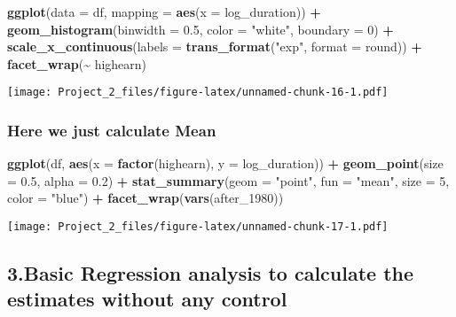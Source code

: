 \documentclass[
]{article}
\newenvironment{Shaded}{\begin{snugshade}}{\end{snugshade}}
\newcommand{\AttributeTok}[1]{\textcolor[rgb]{0.13,0.29,0.53}{#1}}
\newcommand{\DecValTok}[1]{\textcolor[rgb]{0.00,0.00,0.81}{#1}}
\newcommand{\FloatTok}[1]{\textcolor[rgb]{0.00,0.00,0.81}{#1}}
\newcommand{\FunctionTok}[1]{\textcolor[rgb]{0.13,0.29,0.53}{\textbf{#1}}}
\newcommand{\NormalTok}[1]{#1}
\newcommand{\SpecialCharTok}[1]{\textcolor[rgb]{0.81,0.36,0.00}{\textbf{#1}}}
\newcommand{\StringTok}[1]{\textcolor[rgb]{0.31,0.60,0.02}{#1}}
\begin{document}
\begin{Shaded}
\begin{Highlighting}[]
\FunctionTok{ggplot}\NormalTok{(}\AttributeTok{data =}\NormalTok{ df, }\AttributeTok{mapping =} \FunctionTok{aes}\NormalTok{(}\AttributeTok{x =}\NormalTok{ log\_duration)) }\SpecialCharTok{+}
  \FunctionTok{geom\_histogram}\NormalTok{(}\AttributeTok{binwidth =} \FloatTok{0.5}\NormalTok{, }\AttributeTok{color =} \StringTok{"white"}\NormalTok{, }\AttributeTok{boundary =} \DecValTok{0}\NormalTok{) }\SpecialCharTok{+} 
   \FunctionTok{scale\_x\_continuous}\NormalTok{(}\AttributeTok{labels =} \FunctionTok{trans\_format}\NormalTok{(}\StringTok{"exp"}\NormalTok{, }\AttributeTok{format =}\NormalTok{ round)) }\SpecialCharTok{+}
  \FunctionTok{facet\_wrap}\NormalTok{(}\SpecialCharTok{\textasciitilde{}}\NormalTok{ highearn)}
\end{Highlighting}
\end{Shaded}

\texttt{[image: Project\_2\_files/figure-latex/unnamed-chunk-16-1.pdf]}

\subsubsection{Here we just calculate
Mean}\label{here-we-just-calculate-mean}

\begin{Shaded}
\begin{Highlighting}[]
\FunctionTok{ggplot}\NormalTok{(df, }\FunctionTok{aes}\NormalTok{(}\AttributeTok{x =} \FunctionTok{factor}\NormalTok{(highearn), }\AttributeTok{y =}\NormalTok{ log\_duration)) }\SpecialCharTok{+}
  \FunctionTok{geom\_point}\NormalTok{(}\AttributeTok{size =} \FloatTok{0.5}\NormalTok{, }\AttributeTok{alpha =} \FloatTok{0.2}\NormalTok{) }\SpecialCharTok{+}
  \FunctionTok{stat\_summary}\NormalTok{(}\AttributeTok{geom =} \StringTok{"point"}\NormalTok{, }\AttributeTok{fun =} \StringTok{"mean"}\NormalTok{, }\AttributeTok{size =} \DecValTok{5}\NormalTok{, }\AttributeTok{color =} \StringTok{"blue"}\NormalTok{) }\SpecialCharTok{+}
  \FunctionTok{facet\_wrap}\NormalTok{(}\FunctionTok{vars}\NormalTok{(after\_1980))}
\end{Highlighting}
\end{Shaded}

\texttt{[image: Project\_2\_files/figure-latex/unnamed-chunk-17-1.pdf]}

\subsection{3.Basic Regression analysis to calculate the estimates
without any
control}\label{basic-regression-analysis-to-calculate-the-estimates-without-any-control}
\end{document}
